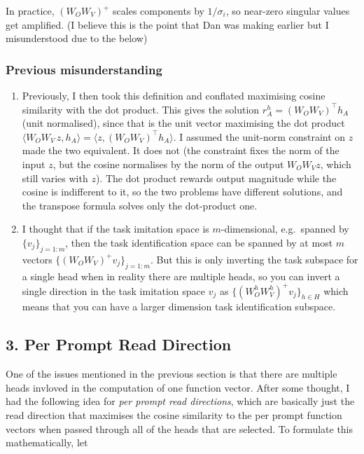 \documentclass[
]{article}
\providecommand{\tightlist}{%
  \setlength{\itemsep}{0pt}\setlength{\parskip}{0pt}}
\begin{document}
In practice, \((W_O W_V)^{+}\) scales components by \(1/\sigma_i\), so
near-zero singular values get amplified. (I believe this is the point
that Dan was making earlier but I misunderstood due to the below)

\subsubsection{Previous
misunderstanding}\label{previous-misunderstanding}

\begin{enumerate}
\def\labelenumi{\arabic{enumi})}
\tightlist
\item
  Previously, I then took this definition and conflated maximising
  cosine similarity with the dot product. This gives the solution
  \(r^h_A = (W_O W_V)^\top h_A\) (unit normalised), since that is the
  unit vector maximising the dot product
  \(\langle W_O W_V\, z, h_A \rangle = \langle z, (W_O W_V)^\top h_A \rangle\).
  I assumed the unit-norm constraint on \(z\) made the two equivalent.
  It does not (the constraint fixes the norm of the input \(z\), but the
  cosine normalises by the norm of the output \(W_O W_V z\), which still
  varies with \(z\)). The dot product rewards output magnitude while the
  cosine is indifferent to it, so the two problems have different
  solutions, and the transpose formula solves only the dot-product one.
\item
  I thought that if the task imitation space is \(m\)-dimensional,
  e.g.~spanned by \(\{v_{j}\}_{j = 1 \colon m}\), then the task
  identification space can be spanned by at most \(m\) vectors
  \(\{(W_O W_V)^{+} v_{j}\}_{j = 1 \colon m}\). But this is only
  inverting the task subspace for a single head when in reality there
  are multiple heads, so you can invert a single direction in the task
  imitation space \(v_j\) as \(\{(W^h_O W^h_V)^{+} v_{j}\}_{h \in H}\)
  which means that you can have a larger dimension task identification
  subspace.
\end{enumerate}

\subsection{3. Per Prompt Read
Direction}\label{per-prompt-read-direction}

One of the issues mentioned in the previous section is that there are
multiple heads invloved in the computation of one function vector. After
some thought, I had the following idea for \emph{per prompt read
directions}, which are basically just the read direction that maximises
the cosine similarity to the per prompt function vectors when passed
through all of the heads that are selected. To formulate this
mathematically, let
\end{document}
